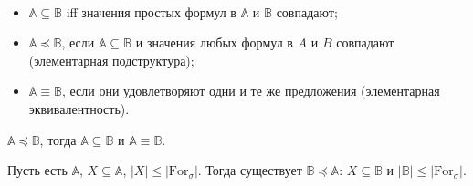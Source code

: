 \begin{definition} \ 
    
    \begin{itemize}
        \item $\mathbb{A} \subseteq \mathbb{B}$ iff значения простых формул в $\mathbb{A}$ и $\mathbb{B}$ совпадают; 
        \item $\mathbb{A} \preceq \mathbb{B}$, если $\mathbb{A} \subseteq \mathbb{B}$ и значения любых формул в $A$ и $B$ совпадают (элементарная подструктура); 
        \item $\mathbb{A} \equiv \mathbb{B}$, если они удовлетворяют одни и те же предложения (элементарная эквивалентность).
    \end{itemize}
\end{definition}

\begin{stat}
    $\mathbb{A} \preceq \mathbb{B}$, тогда $\mathbb{A} \subseteq \mathbb{B}$ и $\mathbb{A} \equiv \mathbb{B}$. 
\end{stat}

\begin{theorem}
    Пусть есть $\mathbb{A}$, $X \subseteq \mathbb{A}$, $|X| \leq |\text{For}_\sigma|$. Тогда существует $\mathbb{B} \preceq \mathbb{A}$: $X \subseteq \mathbb{B}$ и $|\mathbb{B}| \leq |\text{For}_\sigma|$. 
\end{theorem}